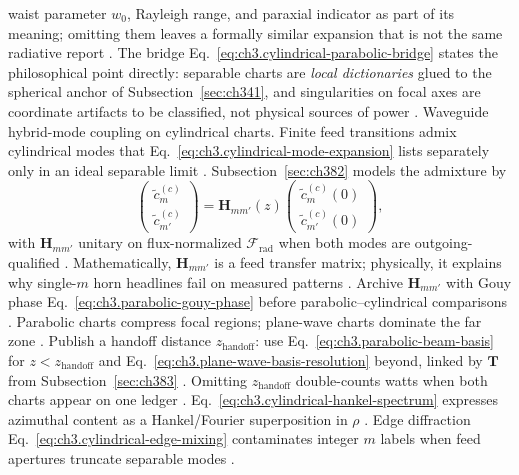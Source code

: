 waist parameter \(w_{0}\), Rayleigh range, and paraxial indicator as part of its meaning; omitting them leaves a
formally similar expansion that is not the same radiative report \cite{allen1992}. The bridge
Eq.~\eqref{eq:ch3.cylindrical-parabolic-bridge} states the philosophical point directly: separable charts are
\emph{local dictionaries} glued to the spherical anchor of Subsection~\ref{sec:ch341}, and singularities on focal axes
are coordinate artifacts to be classified, not physical sources of power \cite{jackson1999}.
Waveguide hybrid-mode coupling on cylindrical charts. Finite feed transitions admix cylindrical modes that Eq.~\eqref{eq:ch3.cylindrical-mode-expansion} lists separately only in an ideal separable limit \cite{stratton1941}. Subsection~\ref{sec:ch382} models the admixture by
\begin{equation}
\label{eq:ch3.cylindrical-hybrid-coupling}
\begin{pmatrix}\widetilde{c}_{m}^{(c)}\\\widetilde{c}_{m'}^{(c)}\end{pmatrix}
=
\mathbf{H}_{m m'}(z)
\begin{pmatrix}\widetilde{c}_{m}^{(c)}(0)\\\widetilde{c}_{m'}^{(c)}(0)\end{pmatrix},
\end{equation}
with \(\mathbf{H}_{m m'}\) unitary on flux-normalized \(\mathcal{F}_{\mathrm{rad}}\) when both modes are outgoing-qualified \cite{poynting1884}. Mathematically, \(\mathbf{H}_{m m'}\) is a feed transfer matrix; physically, it explains why single-\(m\) horn headlines fail on measured patterns \cite{jackson1999}. Archive \(\mathbf{H}_{m m'}\) with Gouy phase Eq.~\eqref{eq:ch3.parabolic-gouy-phase} before parabolic--cylindrical comparisons \cite{allen1992}.
Parabolic charts compress focal regions; plane-wave charts dominate the far zone \cite{jackson1999}. Publish a handoff distance \(z_{\mathrm{handoff}}\): use Eq.~\eqref{eq:ch3.parabolic-beam-basis} for \(z<z_{\mathrm{handoff}}\) and Eq.~\eqref{eq:ch3.plane-wave-basis-resolution} beyond, linked by \(\mathbf{T}\) from Subsection~\ref{sec:ch383} \cite{hansen1988}. Omitting \(z_{\mathrm{handoff}}\) double-counts watts when both charts appear on one ledger \cite{harrington2001}.
Eq.~\eqref{eq:ch3.cylindrical-hankel-spectrum} expresses azimuthal content as a Hankel/Fourier superposition in \(\rho\) \cite{stratton1941}.
Edge diffraction Eq.~\eqref{eq:ch3.cylindrical-edge-mixing} contaminates integer \(m\) labels when feed apertures truncate separable modes \cite{harrington2001}.
